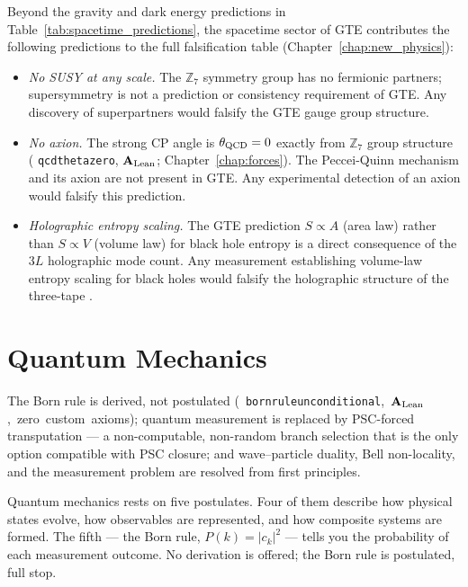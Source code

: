 \documentclass[11pt,openany]{book}
\theoremstyle{remark}
\newcommand{\ZS}{\mathbb{Z}_7}
\newcommand{\lean}[1]{%
  \penalty-100
  \begingroup\def\_{\textunderscore\allowbreak}\texttt{#1}\endgroup}
\newcommand{\CMCA}{\text{CMCA}}
\newcommand{\CatAL}{\ensuremath{\textbf{A}_{\rm Lean}}}
\begin{document}
Beyond the gravity and dark energy predictions in Table~\ref{tab:spacetime_predictions},
the spacetime sector of GTE contributes the following predictions to the full
falsification table (Chapter~\ref{chap:new_physics}):
\begin{itemize}
\item \textit{No SUSY at any scale.} The $\ZS$ symmetry group has no fermionic
  partners; supersymmetry is not a prediction or consistency requirement of GTE.
  Any discovery of superpartners would falsify the GTE gauge group structure.
\item \textit{No axion.} The strong CP angle is $\theta_{\rm QCD} = 0$ exactly from
  $\ZS$ group structure (\lean{qcd\_theta\_zero}, \CatAL; Chapter~\ref{chap:forces}).
  The Peccei-Quinn mechanism and its axion are not present in GTE.
  Any experimental detection of an axion would falsify this prediction.
\item \textit{Holographic entropy scaling.} The GTE prediction $S \propto A$ (area
  law) rather than $S \propto V$ (volume law) for black hole entropy is a direct
  consequence of the $3L$ holographic mode count.
  Any measurement establishing volume-law entropy scaling for black holes would
  falsify the holographic structure of the three-tape \CMCA{}.
\end{itemize}

\chapter{Quantum Mechanics}
\label{chap:qm}

\begin{tcolorbox}[colback=blue!5,colframe=blue!50!black,title={Chapter~9 Claim}]
The Born rule is derived, not postulated \mbox{(\lean{born\_rule\_unconditional}, \CatAL, zero custom axioms)};
quantum measurement is replaced by PSC-forced transputation --- a
non-computable, non-random branch selection that is the only option compatible with PSC
closure; and wave--particle duality, Bell non-locality, and the measurement problem
are resolved from first principles.
\end{tcolorbox}

Quantum mechanics rests on five postulates.  Four of them describe how physical states
evolve, how observables are represented, and how composite systems are formed.  The fifth
--- the Born rule, $P(k) = |c_k|^2$ --- tells you the probability of each measurement
outcome.  No derivation is offered; the Born rule is postulated, full stop.
\end{document}
